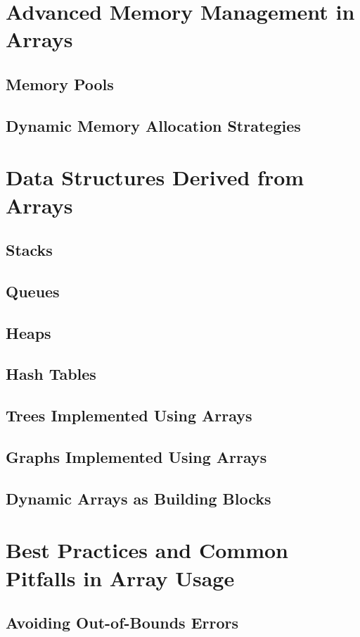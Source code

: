 \documentclass[12pt, oneside]{book}
\begin{document}
\chapter{Advanced Memory Management in Arrays}
\section{Memory Pools}
\section{Dynamic Memory Allocation Strategies}

\chapter{Data Structures Derived from Arrays}
\section{Stacks}
\section{Queues}
\section{Heaps}
\section{Hash Tables}
\section{Trees Implemented Using Arrays}
\section{Graphs Implemented Using Arrays}
\section{Dynamic Arrays as Building Blocks}

\chapter{Best Practices and Common Pitfalls in Array Usage}
\section{Avoiding Out-of-Bounds Errors}
\end{document}
